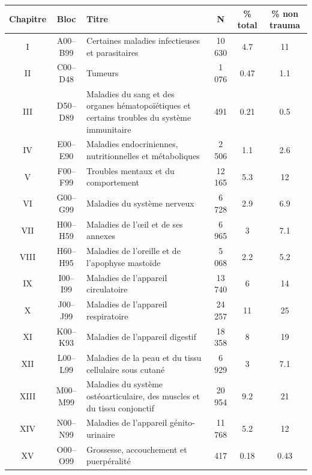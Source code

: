 \documentclass[12pt,english,french,twoside]{book}\usepackage[]{graphicx}\usepackage[]{color}
\begin{document}

\begin{longtable}{|c|c|m{4cm}|c|c|c|}
 \hline
 Chapitre & Bloc & Titre & N & \% total  & \% non trauma \\
 \hline
 
I & A00–B99 & Certaines maladies infectieuses et parasitaires & 10 630 & 4.7 & 11 \\

 II&C00–D48&Tumeurs&1 076&0.47&1.1\\
 
III&D50–D89&Maladies du sang et des organes hématopoïétiques et certains troubles du système immunitaire&491&0.21&0.5\\

IV&E00–E90&Maladies endocriniennes, nutritionnelles et métaboliques&2 506&1.1&2.6\\

V&F00–F99&Troubles mentaux et du comportement&12 165&5.3&12\\

VI&G00–G99&Maladies du système nerveux&6 728&2.9&6.9\\

VII & H00–H59 & Maladies de l’œil et de ses annexes & 6 965 & 3&7.1\\

VIII&H60–H95&Maladies de l'oreille et de l'apophyse mastoïde&5 068&2.2&5.2\\

IX&I00–I99&Maladies de l'appareil circulatoire&13 740&6&14\\

X&J00–J99&Maladies de l'appareil respiratoire&24 257&11&25\\

XI&K00–K93&Maladies de l'appareil digestif&18 358&8&19\\

XII&L00–L99&Maladies de la peau et du tissu cellulaire sous cutané&6 929&3&7.1\\

XIII&M00–M99&Maladies du système ostéoarticulaire, des muscles et du tissu conjonctif&20 954&9.2&21\\

XIV&N00–N99&Maladies de l'appareil génito-urinaire&11 768&5.2&12\\

XV&O00–O99&Grossesse, accouchement et puerpéralité&417&0.18&0.43\\


\end{longtable}
\end{document}
